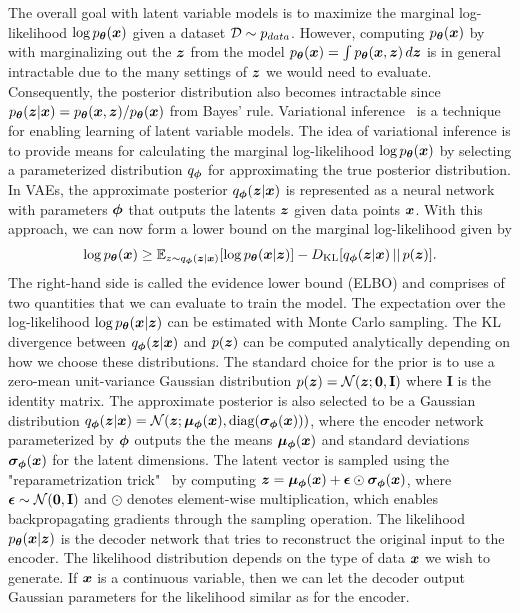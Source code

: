 The overall goal with latent variable models is to maximize the marginal log-likelihood $\log p_{{\bm{\theta}}}({\bm{x}})$ given a dataset ${\mathcal{D}} \sim p_{data}$. However, computing $p_{{\bm{\theta}}}({\bm{x}})$ by with marginalizing out the ${\bm{z}}$ from the model $p_{{\bm{\theta}}}({\bm{x}}) = \int p_{{\bm{\theta}}}({\bm{x}}, {\bm{z}}) \, d{\bm{z}}$ is in general intractable due to the many settings of ${\bm{z}}$ we would need to evaluate. Consequently, the posterior distribution also becomes intractable since $p_{{\bm{\theta}}}({\bm{z}} | {\bm{x}}) = p_{{\bm{\theta}}}({\bm{x}}, {\bm{z}}) / p_{{\bm{\theta}}}({\bm{x}})$ from Bayes' rule. Variational inference~\cite{zhang2018advances, blei2017variational} is a technique for enabling learning of latent variable models. The idea of variational inference is to provide means for calculating the marginal log-likelihood $\log p_{{\bm{\theta}}}({\bm{x}})$ by selecting a parameterized distribution $q_{{\bm{\phi}}}$ for approximating the true posterior distribution. In VAEs, the approximate posterior $q_{{\bm{\phi}}}({\bm{z}} | {\bm{x}})$ is represented as a neural network with parameters ${\bm{\phi}}$ that outputs the latents ${\bm{z}}$ given data points ${\bm{x}}$. With this approach, we can now form a lower bound on the marginal log-likelihood given by 
\begin{align}
	\log p_{{\bm{\theta}}}({\bm{x}}) \geq \mathbb{E}_{z \sim q_{{\bm{\phi}}}({\bm{z}} | {\bm{x}})}[\log p_{{\bm{\theta}}}({\bm{x}} | {\bm{z}})] - D_{\mathrm{KL}}[q_{{\bm{\phi}}}({\bm{z}} |  {\bm{x}}) \, || \, p({\bm{z}})] . 
\end{align}
The right-hand side is called the evidence lower bound (ELBO) and comprises of two quantities that we can evaluate to train the model. The expectation over the log-likelihood $\log p_{{\bm{\theta}}}({\bm{x}} | {\bm{z}})$ can be estimated with Monte Carlo sampling. The KL divergence between $q_{{\bm{\phi}}}({\bm{z}} |  {\bm{x}})$ and $p({\bm{z}})$ can be computed analytically depending on how we choose these distributions. The standard choice for the prior is to use a zero-mean unit-variance Gaussian distribution $p({\bm{z}}) = {\mathcal{N}}({\bm{z}}; \bm{0}, \mathbf{I})$ where $\mathbf{I}$ is the identity matrix. The approximate posterior is also selected to be a Gaussian distribution $q_{{\bm{\phi}}}({\bm{z}} | {\bm{x}}) = {\mathcal{N}}({\bm{z}}; {\bm{\mu}}_{{\bm{\phi}}}({\bm{x}}), \text{diag}({\bm{\sigma}}_{{\bm{\phi}}}({\bm{x}})))$, where the encoder network parameterized by ${\bm{\phi}}$ outputs the the means ${\bm{\mu}}_{{\bm{\phi}}}({\bm{x}})$ and standard deviations ${\bm{\sigma}}_{{\bm{\phi}}}({\bm{x}})$ for the latent dimensions. The latent vector is sampled using the "reparametrization trick"~\cite{rezende2014stochastic, kingma2013auto} by computing ${\bm{z}} = {\bm{\mu}}_{{\bm{\phi}}}({\bm{x}}) + {\bm{\epsilon}} \odot {\bm{\sigma}}_{{\bm{\phi}}}({\bm{x}})$, where ${\bm{\epsilon}} \sim {\mathcal{N}}(\bm{0}, \mathbf{I})$ and $\odot$ denotes element-wise multiplication, which enables backpropagating gradients through the sampling operation. The likelihood $p_{{\bm{\theta}}}({\bm{x}} | {\bm{z}})$ is the decoder network that tries to reconstruct the original input to the encoder. The likelihood distribution depends on the type of data ${\bm{x}}$ we wish to generate. If ${\bm{x}}$ is a continuous variable, then we can let the decoder output Gaussian parameters for the likelihood similar as for the encoder. 

